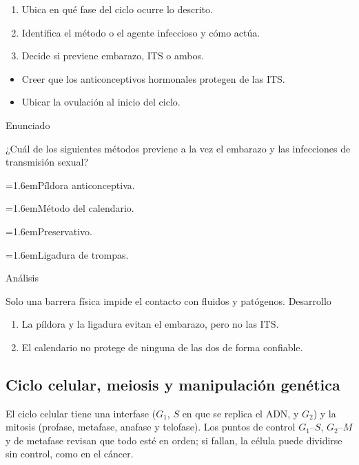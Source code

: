 \documentclass[10pt,a4paper,twocolumn]{article}
\newcommand{\alternativa}[2]{\par\noindent\hangindent=1.6em\hangafter=1\makebox[1.6em][l]{\tecla{#1}}#2\par}
\newcommand{\clave}[1]{\par\smallskip{\sffamily\footnotesize\color{esmeralda} Clave \teclaok{#1}}\par}
\begin{document}
\begin{metodo}
\begin{enumerate}
  \item Ubica en qué fase del ciclo ocurre lo descrito.
  \item Identifica el método o el agente infeccioso y cómo actúa.
  \item Decide si previene embarazo, ITS o ambos.
\end{enumerate}
\end{metodo}

\begin{errorfrecuente}
\begin{itemize}
  \item Creer que los anticonceptivos hormonales protegen de las ITS.
  \item Ubicar la ovulación al inicio del ciclo.
\end{itemize}
\end{errorfrecuente}

\begin{ejemplo}
{\sffamily\footnotesize\color{zinc500} Enunciado}\par
¿Cuál de los siguientes métodos previene a la vez el embarazo y las infecciones de transmisión sexual?
\alternativa{A}{Píldora anticonceptiva.}
\alternativa{B}{Método del calendario.}
\alternativa{C}{Preservativo.}
\alternativa{D}{Ligadura de trompas.}
\clave{C}
{\sffamily\footnotesize\color{zinc500} Análisis}\par Solo una barrera física impide el contacto con fluidos y patógenos.
{\sffamily\footnotesize\color{zinc500} Desarrollo}
\begin{enumerate}
  \item La píldora y la ligadura evitan el embarazo, pero no las ITS.
  \item El calendario no protege de ninguna de las dos de forma confiable.
\end{enumerate}
\end{ejemplo}

\subsection{Ciclo celular, meiosis y manipulación genética}

El ciclo celular tiene una interfase ($G_1$, $S$ en que se replica el ADN, y $G_2$) y la mitosis (profase, metafase, anafase y telofase). Los puntos de control $G_1$–$S$, $G_2$–$M$ y de metafase revisan que todo esté en orden; si fallan, la célula puede dividirse sin control, como en el cáncer.
\end{document}
